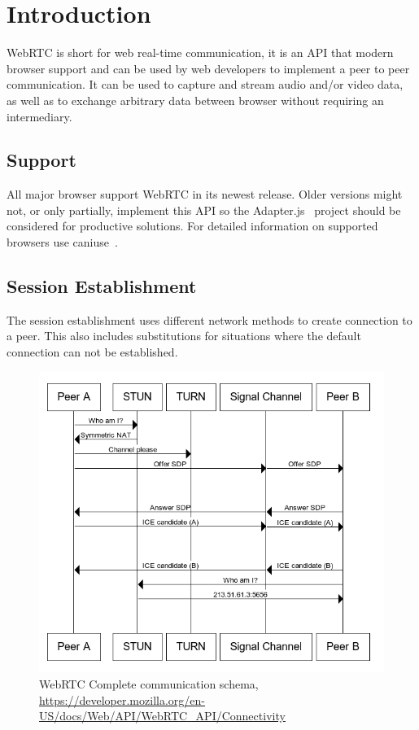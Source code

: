 \clearpage
\chapter{Introduction}
WebRTC is short for web real-time communication, it is an API that modern browser support and can be used by web developers to implement a peer to peer communication. It can be used to capture and stream audio and/or video data, as well as to exchange arbitrary data between browser without requiring an intermediary.

\section{Support}
All major browser support WebRTC in its newest release. Older versions might not, or only partially, implement this API so the Adapter.js~\autocite{adapterjs} project should be considered for productive solutions. For detailed information on supported browsers use caniuse~\autocite{caniuse}.

\section{Session Establishment}
The session establishment uses different network methods to create connection to a peer. This also includes substitutions for situations where the default connection can not be established.

\begin{figure}[H]
	\includegraphics[scale=0.5]{webrtc-complete-diagram.png}
	\centering
	\caption{WebRTC Complete communication schema, \url{https://developer.mozilla.org/en-US/docs/Web/API/WebRTC_API/Connectivity}}
	\label{fig:WebRTC}
\end{figure}

